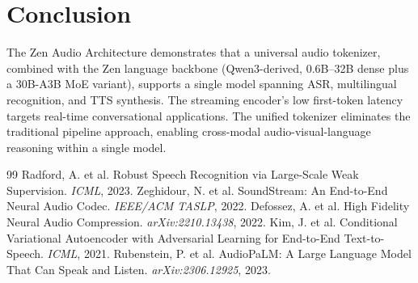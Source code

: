 \documentclass[11pt,a4paper]{article}
\begin{document}
\section{Conclusion}

The Zen Audio Architecture demonstrates that a universal audio tokenizer, combined with the Zen language backbone (Qwen3-derived, 0.6B--32B dense plus a 30B-A3B MoE variant), supports a single model spanning ASR, multilingual recognition, and TTS synthesis. The streaming encoder's low first-token latency targets real-time conversational applications. The unified tokenizer eliminates the traditional pipeline approach, enabling cross-modal audio-visual-language reasoning within a single model.

\begin{thebibliography}{99}
 Radford, A. et al. Robust Speech Recognition via Large-Scale Weak Supervision. \textit{ICML}, 2023.
 Zeghidour, N. et al. SoundStream: An End-to-End Neural Audio Codec. \textit{IEEE/ACM TASLP}, 2022.
 Defossez, A. et al. High Fidelity Neural Audio Compression. \textit{arXiv:2210.13438}, 2022.
 Kim, J. et al. Conditional Variational Autoencoder with Adversarial Learning for End-to-End Text-to-Speech. \textit{ICML}, 2021.
 Rubenstein, P. et al. AudioPaLM: A Large Language Model That Can Speak and Listen. \textit{arXiv:2306.12925}, 2023.
\end{thebibliography}
\end{document}
